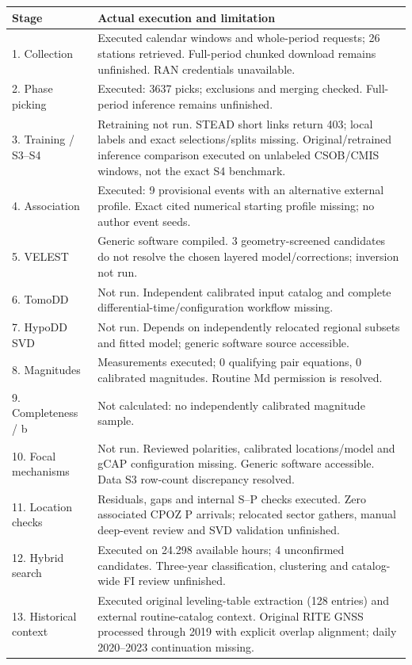 \begin{longtable}{p{.20\linewidth}p{.73\linewidth}}
\toprule Stage & Actual execution and limitation\\\midrule\endhead
1. Collection & Executed calendar windows and whole-period requests; 26 stations retrieved. Full-period chunked download remains unfinished. RAN credentials unavailable.\\[4pt]
2. Phase picking & Executed: 3637 picks; exclusions and merging checked. Full-period inference remains unfinished.\\[4pt]
3. Training / S3--S4 & Retraining not run. STEAD short links return 403; local labels and exact selections/splits missing. Original/retrained inference comparison executed on unlabeled CSOB/CMIS windows, not the exact S4 benchmark.\\[4pt]
4. Association & Executed: 9 provisional events with an alternative external profile. Exact cited numerical starting profile missing; no author event seeds.\\[4pt]
5. VELEST & Generic software compiled. 3 geometry-screened candidates do not resolve the chosen layered model/corrections; inversion not run.\\[4pt]
6. TomoDD & Not run. Independent calibrated input catalog and complete differential-time/configuration workflow missing.\\[4pt]
7. HypoDD SVD & Not run. Depends on independently relocated regional subsets and fitted model; generic software source accessible.\\[4pt]
8. Magnitudes & Measurements executed; 0 qualifying pair equations, 0 calibrated magnitudes. Routine Md permission is resolved.\\[4pt]
9. Completeness / b & Not calculated: no independently calibrated magnitude sample.\\[4pt]
10. Focal mechanisms & Not run. Reviewed polarities, calibrated locations/model and gCAP configuration missing. Generic software accessible. Data S3 row-count discrepancy resolved.\\[4pt]
11. Location checks & Residuals, gaps and internal S--P checks executed. Zero associated CPOZ P arrivals; relocated sector gathers, manual deep-event review and SVD validation unfinished.\\[4pt]
12. Hybrid search & Executed on 24.298 available hours; 4 unconfirmed candidates. Three-year classification, clustering and catalog-wide FI review unfinished.\\[4pt]
13. Historical context & Executed original leveling-table extraction (128 entries) and external routine-catalog context. Original RITE GNSS processed through 2019 with explicit overlap alignment; daily 2020--2023 continuation missing.\\[4pt]
\bottomrule\end{longtable}
